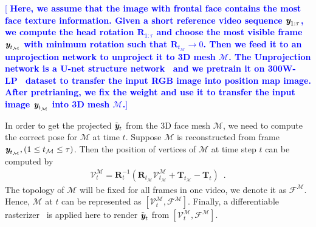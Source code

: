 \documentclass[runningheads]{llncs}
\def\mathbi#1{\textbf{\em #1}}
\providecommand{\lchen}[1]{\textcolor{blue}{[{\bf #1}]}}
\begin{document}
\lchen{ \indent Here, we assume that the image with frontal face contains the most face texture information. Given a short reference video sequence $\mathbi{y}_{1:\tau}$, we compute the head rotation $\mathbf{R}_{1:\tau}$ and choose the most visible frame $\mathbi{y}_{t_{\mathcal{M}}}$ with minimum rotation such that $\mathbf{R}_{t_{\mathcal{M}}} \rightarrow 0$. Then we feed it to an unprojection network to unproject it to 3D mesh $\mathcal{M}$. The Unprojection network is a U-net structure network~\cite{feng2018joint} and we pretrain it on  300W-LP~\cite{zhu2016face} dataset to transfer the input RGB image into position map image. After pretrianing, we fix the weight and use it to transfer the input image $\mathbi{y}_{t_{\mathcal{M}}}$ into 3D mesh $\mathcal{M}$.}
 
\indent  In order to get the projected $\tilde{\mathbi{y}}_t$ from the 3D face mesh $\mathcal{M}$, we need to compute the correct pose for $\mathcal{M}$ at time $t$. Suppose $\mathcal{M}$ is reconstructed from frame $\mathbi{y}_{t_{\mathcal{M}}}, (1\le t_{\mathcal{M}}\le \tau)$. Then the position of vertices of $\mathcal{M}$ at time step $t$ can be computed by
\begin{equation}
\begin{aligned}
\mathcal{V}^{\mathcal{M}}_t = \mathbf{R}_t^{-1}(\mathbf{R}_{t_{\mathcal{M}}}\mathcal{V}^{\mathcal{M}}_{t_{\mathcal{M}}} + \mathbf{T}_{t_{\mathcal{M}}} - \mathbf{T}_t) \enspace.
\end{aligned}
\label{eq:projector}    
\end{equation}
The topology of $\mathcal{M}$ will be fixed for all frames in one video, we denote it as $\mathcal{F}^{\mathcal{M}}$. Hence, $\mathcal{M}$ at $t$ can be represented as $\left[\mathcal{V}^{\mathcal{M}}_t, \mathcal{F}^{\mathcal{M}}\right]$. Finally, a differentiable rasterizer~\cite{liu2019softras} is applied here to render $\tilde{\mathbi{y}}_t$ from $\left[\mathcal{V}^{\mathcal{M}}_t, \mathcal{F}^{\mathcal{M}}\right]$. 
\end{document}
